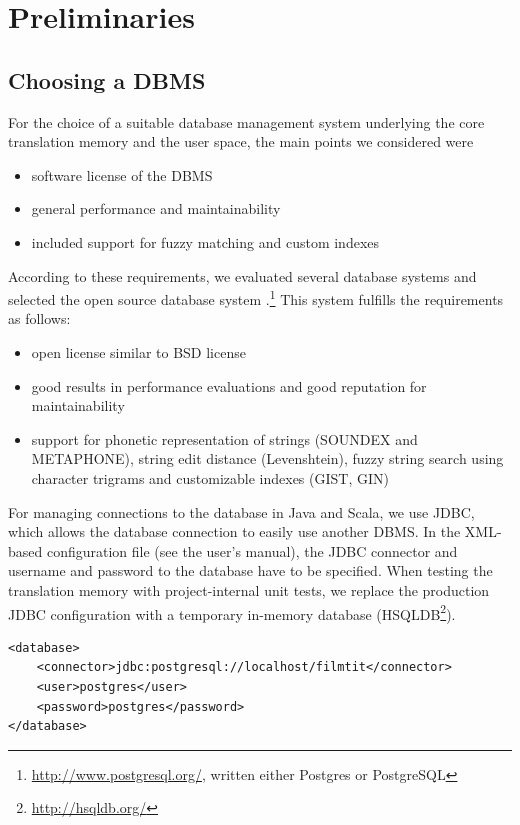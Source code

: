 \section{Preliminaries}

\subsection{Choosing a DBMS}
\label{sec:dbms}

For the choice of a suitable database management system underlying the
core translation memory and the user space, the main points we
considered were

\begin{itemize}
\item
  software license of the DBMS
\item
  general performance and maintainability
\item
  included support for fuzzy matching and custom indexes
\end{itemize}
According to these requirements, we evaluated several database systems
and selected the open source database system
\postgres.\footnote{\url{http://www.postgresql.org/}, written either Postgres or PostgreSQL} This system
fulfills the requirements as follows:

\begin{itemize}
\item
  open license similar to BSD license
\item
  good results in performance evaluations and good reputation for
  maintainability
\item
  support for phonetic representation of strings (SOUNDEX and
  METAPHONE), string edit distance (Levenshtein), fuzzy string search
  using character trigrams and customizable indexes (GIST, GIN)
\end{itemize}

For managing connections to the database in Java and Scala, we use JDBC, 
which allows the database connection to easily use another DBMS. 
In the XML-based configuration file (see the user's manual), the JDBC connector
and username and password to the database have to be specified. When testing the
translation memory with project-internal unit tests, we replace the production JDBC
configuration with a temporary in-memory database (HSQLDB\footnote{\url{http://hsqldb.org/}}).

\begin{lstlisting}
<database>
    <connector>jdbc:postgresql://localhost/filmtit</connector>
    <user>postgres</user>
    <password>postgres</password>
</database>
\end{lstlisting}


